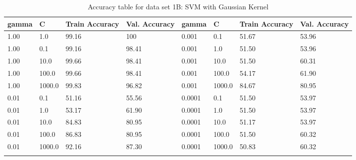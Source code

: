 \def\arraystretch{1.25}
\begin{center}
{\small
\begin{longtable}{l l l l l l l l}
\hline
\hline
\textbf{gamma} & \textbf{C} & \textbf{Train Accuracy}  & \textbf{Val. Accuracy} & \textbf{gamma} & \textbf{C} & \textbf{Train Accuracy}  & \textbf{Val. Accuracy}\\
\hline
\hline
1.00 & 1.0 & 99.16 & 100 & 0.001 & 0.1 & 51.67 & 53.96 \\
1.00 & 0.1 & 99.16 & 98.41  & 0.001 & 1.0 & 51.50 & 53.96 \\
1.00 & 10.0 & 99.66 & 98.41  & 0.001 & 10.0 & 51.50 & 60.31 \\
1.00 & 100.0 & 99.66 & 98.41  & 0.001 & 100.0 & 54.17 & 61.90 \\
1.00 & 1000.0 & 99.83 & 96.82  & 0.001 & 1000.0 & 84.67 & 80.95\\
0.01 & 0.1 & 51.16 & 55.56  & 0.0001 & 0.1 & 51.50 & 53.97 \\
0.01 & 1.0 & 53.17 & 61.90  & 0.0001 & 1.0 & 51.50 & 53.97 \\
0.01 & 10.0 & 84.83 & 80.95  & 0.0001 & 10.0 & 51.17 & 53.97 \\
0.01 & 100.0 & 86.83 & 80.95  & 0.0001 & 100.0 & 51.50 & 60.32 \\
0.01 & 1000.0 & 92.16 & 87.30  & 0.0001 & 1000.0 & 50.83 & 60.32 \\
\hline
\caption{Accuracy table for data set 1B: SVM with Gaussian Kernel}
\end{longtable}
}
\end{center}